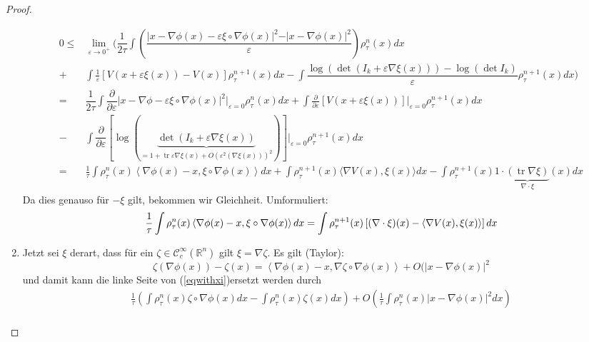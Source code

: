 \documentclass[11pt,a4paper,notitlepage]{scrreprt}
\newcommand{\RR}{\mathbb{R}}
\begin{document}
\begin{proof}
\begin{enumerate}
\begin{align*}
0\leq& \lim_{\varepsilon\to 0^+} \Bigg(\dfrac{1}{2\tau} \int\left(\dfrac{\vert x-\nabla \phi(x)-\varepsilon\xi\circ\nabla\phi(x)\vert^2-\vert x-\nabla\phi(x)\vert^2}{\varepsilon}\right)\rho_\tau^n(x)dx\\
+&\int\frac{1}{\varepsilon}[V(x+\varepsilon\xi(x))-V(x)]\rho_\tau^{n+1}(x)dx-\int\dfrac{\log( \det(I_k+\varepsilon\nabla\xi(x)))-\log(\det I_k)}{\varepsilon}\rho_\tau^{n+1}(x)dx \Bigg)\\
=& \dfrac{1}{2\tau} \int \dfrac{\partial}{\partial\varepsilon}\vert x-\nabla\phi-\varepsilon\xi\circ\nabla\phi(x)\vert^2\Big|_{\varepsilon=0} \rho_\tau^n(x)dx
+\int\frac{\partial}{\partial\varepsilon}[V(x+\varepsilon\xi(x))]\Big|_{\varepsilon=0}\rho_\tau^{n+1}(x)dx\\-&\int\dfrac{\partial}{\partial\varepsilon}[\log(\underset{=1+\operatorname{tr}\varepsilon\nabla\xi(x)+O(\varepsilon^2(\nabla\xi(x)))^2}{\underbrace{\det(I_k+\varepsilon\nabla\xi(x))}})]\Big|_{\varepsilon=0} \rho_\tau^{n+1}(x)dx \\
=&\frac{1}{\tau} \int \rho_\tau^n(x)\left\langle\nabla\phi(x)-x,\xi\circ\nabla\phi(x)\right\rangle dx+\int\rho_\tau^{n+1}(x)\langle\nabla V(x),\xi(x)\rangle dx-\int\rho_\tau^{n+1}(x)1\cdot\underset{\nabla\cdot\xi}{\underbrace{(\operatorname{tr}\nabla\xi)}}(x)dx
\end{align*}
Da dies genauso für $-\xi$ gilt, bekommen wir Gleichheit. Umformuliert:
\begin{equation}
\frac{1}{\tau} \int \rho_\tau^n(x)\left\langle\nabla\phi(x)-x,\xi\circ\nabla\phi(x)\right\rangle dx\\=\int\rho_\tau^{n+1}(x)\left[(\nabla\cdot \xi)(x)-\langle\nabla V(x),\xi(x)\rangle \right]dx \label{eqwithxi}
\end{equation}
\item Jetzt sei $\xi$ derart, dass für ein $\zeta\in \mathcal{C}^\infty_c(\RR^n)$ gilt $\xi=\nabla\zeta$. Es gilt (Taylor):
\begin{equation}
\zeta(\nabla\phi(x))-\zeta(x)=\left\langle\nabla\phi(x)-x,\nabla\zeta\circ\nabla\phi(x)\right\rangle+O(\vert x-\nabla\phi(x)\vert^2
\end{equation}
und damit kann die linke Seite von (\ref{eqwithxi})ersetzt werden durch
\begin{align*}
\frac{1}{\tau}\left(\int \rho_\tau^n(x)\zeta\circ\nabla\phi(x)dx-\int\rho_\tau^n(x)\zeta(x)dx\right)+O\left(\frac{1}{\tau}\int\rho_\tau^n(x)\vert x-\nabla\phi(x)\vert^2dx\right)\\

\end{align*}
\end{enumerate}
\end{proof}
\end{document}

